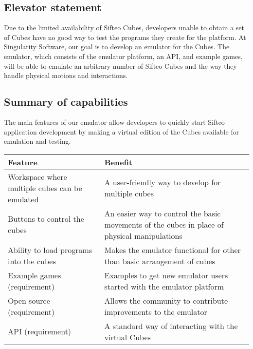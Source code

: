 \documentclass[12pt]{article}
\begin{document}
              \subsection{Elevator statement}
              Due to the limited availability of Sifteo Cubes, developers unable to obtain a set of Cubes have no good way to test the programs they create for the platform. At Singularity Software, our goal is to develop an emulator for the Cubes. The emulator, which consists of the emulator platform, an API, and example games, will be able to emulate an arbitrary number of Sifteo Cubes and the way they handle physical motions and interactions.
\clearpage
              \subsection{Summary of capabilities}
              The main features of our emulator allow developers to quickly start Sifteo application development by making a virtual edition of the Cubes available for emulation and testing.
              \begin{table}[h]
                \begin{tabular}{p{3in} | p{3in}}
                  \textbf{Feature} & \textbf{Benefit} \\ \hline
                  Workspace where multiple cubes can be emulated
                            & A user-friendly way to develop for multiple cubes \\ \hline
                  Buttons to control the cubes
                            & An easier way to control the basic movements of the cubes in place of physical manipulations \\ \hline
                  Ability to load programs into the cubes
                            & Makes the emulator functional for other than basic arrangement of cubes \\ \hline
                  Example games (requirement)
                            & Examples to get new emulator users started with the emulator platform \\ \hline
                  Open source  (requirement)
                            & Allows the community to contribute improvements to the emulator \\ \hline
                  API (requirement)
                            & A standard way of interacting with the virtual Cubes
                \end{tabular}
              \end{table}
\end{document}
